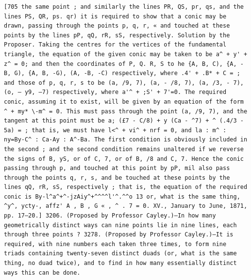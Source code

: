 \documentclass[12pt]{article}
\theoremstyle{plain}
\begin{document}
\newpage
\setcounter{page}{570}
\begin{verbatim}
[705 the same point ; and similarly the lines PR, QS, pr, qs, and the lines PS, QR, ps. qr) it is required to show that a conic may be drawn, passing through the points p, q, r, « and touched at these points by the lines pP, qQ, rR, sS, respectively. Solution by the Proposer. Taking the centres for the vertices of the fundamental triangle, the equation of the given conic may be taken to be a^ + y' + z^ = 0; and then the coordinates of P, Q. R, S to he {A, B, C), {A, - B, G), {A, B, -G), (A, -B, -C) respectively, where .4' + .B* + C = ; and those of p, q, r, s to be (a, /9, 7), (a, - /8, 7), (a, /3, - 7), (o, — y9, —7) respectively, where a'^ + ;S' + 7'=0. The required conic, assuming it to exist, will be given by an equation of the form ^ + my* \-m^ = 0. This must pass through the point (a, /9, 7), and the tangent at this point must be a; (£7 - C/8) + y (Ca - ^7) + ^ (.4/3 - 5a) = ; that is, we must have l<^ + vi^ + nrf = 0, and la : m^ : ny=By-C^ : Ca-Ay : A^-Ba. The first condition is obviously included in the second ; and the second condition remains unaltered if we reverse the signs of B, yS, or of C, 7, or of B, /8 and C, 7. Hence the conic passing through p, and touched at this point by pP, mil also pass through the points q, r, s, and be touched at these points by the lines qQ, rR, sS, respectively ; that is, the equation of the required conic is By-l^a^+^-jzAiy^+^^^^l'^.^^o 13 or, what is the same thing, ^y^, ycty-, affz' A , B , G « , ^ . 7 = 0. XV., January to June, 1871, pp. 17—20.] 3206. (Proposed by Professor Cayley.)—In how many geometrically distinct ways can nine points lie in nine lines, each through three points ? 3278. (Proposed by Professor Cayley.)—It is required, with nine numbers each taken three times, to form nine triads containing twenty-seven distinct duads (or, what is the same thing, no duad twice), and to find in how many essentially distinct ways this can be done. 
\end{verbatim}
\end{document}
